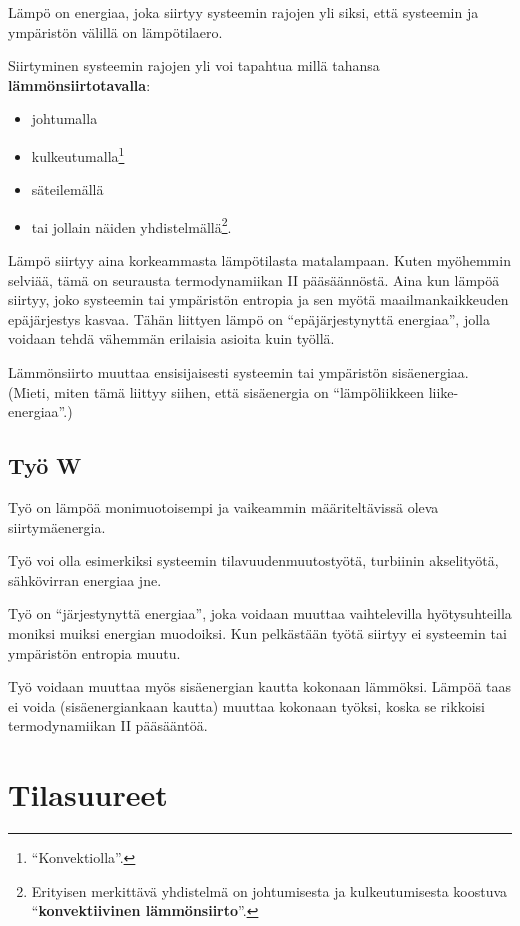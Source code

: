 \documentclass[12pt,a4paper,finnish]{book}
\begin{document}
Lämpö on energiaa, joka siirtyy systeemin rajojen yli siksi, että systeemin ja ympäristön 
välillä on lämpötilaero. 

Siirtyminen systeemin rajojen yli voi tapahtua millä tahansa \textbf{lämmönsiirtotavalla}:

\begin{itemize}
 \item johtumalla
 \item kulkeutumalla\footnote{``Konvektiolla''.}
 \item säteilemällä
 \item tai jollain näiden 
yhdistelmällä\footnote{Erityisen merkittävä yhdistelmä on johtumisesta ja kulkeutumisesta 
koostuva ``\textbf{konvektiivinen lämmönsiirto}''.}.
\end{itemize}

Lämpö siirtyy aina korkeammasta lämpötilasta matalampaan. Kuten myöhemmin selviää, tämä 
on seurausta termodynamiikan II pääsäännöstä. Aina kun lämpöä siirtyy, joko systeemin tai 
ympäristön entropia ja sen myötä maailmankaikkeuden epäjärjestys kasvaa.
Tähän liittyen lämpö on ``epäjärjestynyttä energiaa'', jolla voidaan tehdä vähemmän 
erilaisia asioita kuin työllä.

Lämmönsiirto muuttaa ensisijaisesti systeemin tai ympäristön sisäenergiaa. (Mieti, 
miten tämä liittyy siihen, että sisäenergia on ``lämpöliikkeen liike-energiaa''.)

\section{Työ W}

Työ on lämpöä monimuotoisempi ja vaikeammin määriteltävissä oleva siirtymäenergia. 

Työ voi olla esimerkiksi systeemin tilavuudenmuutostyötä, turbiinin akselityötä, 
sähkövirran energiaa jne.

Työ on ``järjestynyttä energiaa'', joka voidaan muuttaa vaihtelevilla hyötysuhteilla 
moniksi muiksi energian muodoiksi. Kun pelkästään työtä siirtyy ei systeemin tai ympäristön 
entropia muutu.

Työ voidaan muuttaa myös sisäenergian kautta kokonaan lämmöksi. Lämpöä taas ei voida 
(sisäenergiankaan kautta) muuttaa kokonaan työksi, koska se rikkoisi termodynamiikan 
II pääsääntöä.

\chapter{Tilasuureet} %
\end{document}
